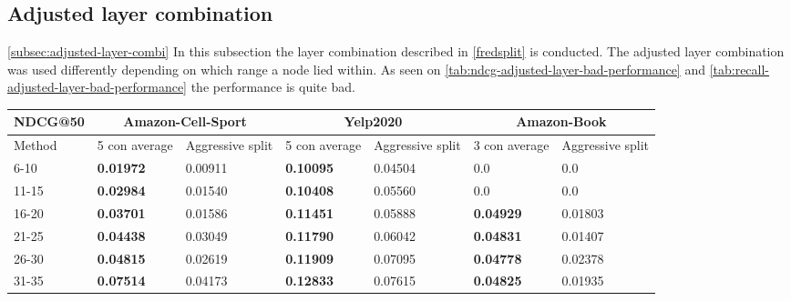 \subsection{Adjusted layer combination} \autoref{subsec:adjusted-layer-combi}
In this subsection the layer combination described in \autoref{fredsplit} is conducted.
The adjusted layer combination was used differently depending on which range a node lied within.
As seen on \autoref{tab:ndcg-adjusted-layer-bad-performance} and \autoref{tab:recall-adjusted-layer-bad-performance} the performance is quite bad.
\begin{table*}[h!]
    \centering
    \begin{tabular}{|l|l|l||l|l||l|l|}
        \hline
        NDCG@50   & \multicolumn{2}{c||}{Amazon-Cell-Sport} & \multicolumn{2}{c||}{Yelp2020} & \multicolumn{2}{c|}{Amazon-Book}                                                          \\ \hline
        Method    & 5 con average                           & Aggressive split               & 5 con average                    & Aggressive split & 3 con average    & Aggressive split \\ \hline
        6-10      & \textbf{0.01972}                        & 0.00911                        & \textbf{0.10095}                 & 0.04504          & 0.0              & 0.0              \\ \hline
        11-15     & \textbf{0.02984}                        & 0.01540                        & \textbf{0.10408}                 & 0.05560          & 0.0              & 0.0              \\ \hline
        16-20     & \textbf{0.03701}                        & 0.01586                        & \textbf{0.11451}                 & 0.05888          & \textbf{0.04929} & 0.01803          \\ \hline
        21-25     & \textbf{0.04438}                        & 0.03049                        & \textbf{0.11790}                 & 0.06042          & \textbf{0.04831} & 0.01407          \\ \hline
        26-30     & \textbf{0.04815}                        & 0.02619                        & \textbf{0.11909}                 & 0.07095          & \textbf{0.04778} & 0.02378          \\ \hline
        31-35     & \textbf{0.07514}                        & 0.04173                        & \textbf{0.12833}                 & 0.07615          & \textbf{0.04825} & 0.01935          \\ \hline

\end{tabular}
\end{table*}
